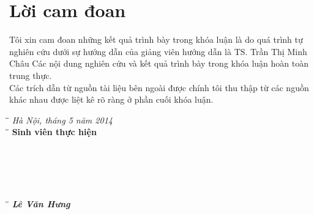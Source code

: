 \chapter*{Lời cam đoan}
Tôi xin cam đoan những kết quả trình bày trong khóa luận là do quá trình tự nghiên cứu dưới sự hướng dẫn của giảng viên hướng dẫn là TS. Trần Thị Minh Châu
Các nội dung nghiên cứu và kết quả trình bày trong khóa luận hoàn toàn trung thực.\\

Các trích dẫn từ nguồn tài liệu bên ngoài được chính tôi thu thập từ các nguồn khác nhau được liệt kê rõ ràng ở phần cuối khóa luận.

\vspace{3 cm}
\begin{tabbing}
\hspace{3in} \= \= \kill
\> \textit{Hà Nội, tháng 5 năm 2014}\\
\hspace{3.4in} \= \= \kill
\> \textbf{Sinh viên thực hiện}\\\\\\\\\\\\
\hspace{3.5in} \= \= \kill
\> \textbf{\textit{Lê Văn Hưng}}
\end{tabbing}	